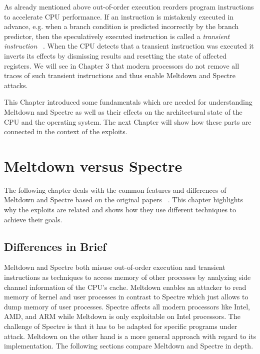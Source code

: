 \documentclass[a4paper,oneside,openright] {scrreprt}
\begin{document}
As already mentioned above out-of-order execution reorders program instructions to accelerate CPU performance.
If an instruction is mistakenly executed in advance, e.g. when a branch condition is predicted incorrectly by the branch predictor, 
then the speculatively executed instruction is called a \textit{transient instruction} ~\cite{lipp2018meltdown, kocher2018spectre}.
When the CPU detects that a transient instruction was executed it inverts its effects by dismissing results and resetting the state of affected registers.
We will see in Chapter 3 that modern processors do not remove all traces of such transient instructions and thus enable
Meltdown and Spectre attacks.

This Chapter introduced some fundamentals which are needed for understanding Meltdown and Spectre as well as their 
effects on the architectural state of the CPU and the operating system. The next Chapter will show how these parts
are connected in the context of the exploits.

\chapter{Meltdown versus Spectre}
\label{ch:contentI}

The following chapter deals with the common features and differences of Meltdown and Spectre based on the
 original papers ~\cite{lipp2018meltdown, kocher2018spectre}. This chapter highlights why the exploits are related
 and shows how they use different techniques to achieve their goals.
 
 
 \section{Differences in Brief}
 \label{ch:intro:motivation}
 
 Meltdown and Spectre both misuse out-of-order execution and transient instructions as techniques to access memory of 
 other processes by analyzing side channel information of the CPU's cache. 
  Meltdown enables an attacker to read memory of kernel and user processes
  in contrast to Spectre which just allows to dump memory of user processes. Spectre affects all modern processors like Intel, AMD, and ARM while Meltdown
 is only exploitable on Intel processors. The challenge of Spectre is that it has to be adapted for specific programs under attack. 
 Meltdown on the other hand is a more general approach with regard to its implementation. The following sections compare Meltdown and Spectre in depth.
 
\end{document}
